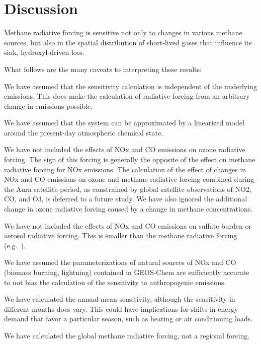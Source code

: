 \section{Discussion}

Methane radiative forcing is sensitive not only to changes in various methane sources, but also in the spatial distribution of short-lived gases that influence its sink, hydroxyl-driven loss.

What follows are the many caveats to interpreting these results:

We have assumed that the sensitivity calculation is independent of the underlying emissions. This does make the calculation of radiative forcing from an arbitrary change in emissions possible.

We have assumed that the system can be approximated by a linearized model around the present-day atmospheric chemical state.

We have not included the effects of NOx and CO emissions on ozone radiative forcing. The sign of this forcing is generally the opposite of the effect on methane radiative forcing for NOx emissions. The calculation of the effect of changes in NOx and CO emissions on ozone and methane radiative forcing combined during the Aura satellite period, as constrained by global satellite observations of NO2, CO, and O3, is deferred to a future study. We have also ignored the additional change in ozone radiative forcing caused by a change in methane concentrations.

We have not included the effects of NOx and CO emissions on sulfate burden or aerosol radiative forcing. This is smaller than the methane radiative forcing (e.g.~\citet{ref:fry2012}).

We have assumed the parameterizations of natural sources of NOx and CO (biomass burning, lightning) contained in GEOS-Chem are sufficiently accurate to not bias the calculation of the sensitivity to anthropogenic emissions.

We have calculated the annual mean sensitivity, although the sensitivity in different months does vary. This could have implications for shifts in energy demand that favor a particular season, such as heating or air conditioning loads.

We have calculated the global methane radiative forcing, not a regional forcing.
